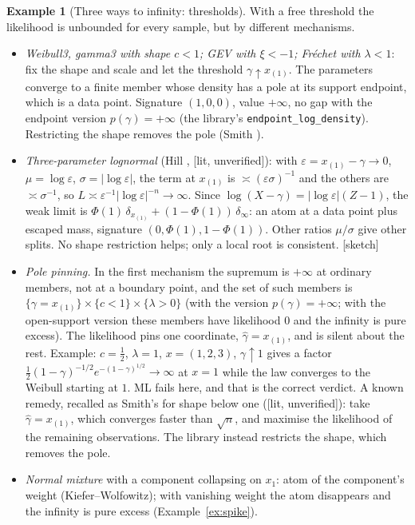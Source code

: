 \documentclass[11pt]{article}
\newcommand{\status}[1]{\textsf{[#1]}}
\theoremstyle{definition}
\newtheorem{example}[theorem]{Example}
\theoremstyle{remark}
\begin{document}
\begin{example}[Three ways to infinity: thresholds]\label{ex:thresholds}
With a free threshold the likelihood is unbounded for every sample, but by
different mechanisms.
\begin{itemize}
\item \emph{Weibull3, gamma3 with shape $c<1$; GEV with $\xi<-1$; Fr\'echet
  with $\lambda<1$}: fix the shape and scale and let the threshold
  $\gamma\uparrow x_{(1)}$. The parameters converge to a finite member whose
  density has a pole at its support endpoint, which is a data point.
  Signature $(1,0,0)$, value $+\infty$, no gap with the endpoint version
  $p(\gamma)=+\infty$ (the library's \texttt{endpoint\_log\_density}).
  Restricting the shape removes the pole (Smith \cite{smith}).
\item \emph{Three-parameter lognormal} (Hill \cite{hill},
  \status{lit, unverified}): with $\varepsilon=x_{(1)}-\gamma\to0$,
  $\mu=\log\varepsilon$, $\sigma=|\log\varepsilon|$, the term at $x_{(1)}$ is
  $\asymp(\varepsilon\sigma)^{-1}$ and the others are $\asymp\sigma^{-1}$, so
  $L\asymp\varepsilon^{-1}|\log\varepsilon|^{-n}\to\infty$. Since
  $\log(X-\gamma)=|\log\varepsilon|(Z-1)$, the weak limit is
  $\Phi(1)\,\delta_{x_{(1)}}+(1-\Phi(1))\,\delta_\infty$: an atom at a data
  point plus escaped mass, signature $(0,\Phi(1),1-\Phi(1))$. Other ratios
  $\mu/\sigma$ give other splits. No shape restriction helps; only a local
  root is consistent. \status{sketch}
\item[] \emph{Pole pinning.} In the first mechanism the supremum is $+\infty$
  at ordinary members, not at a boundary point, and the set of such members
  is $\{\gamma=x_{(1)}\}\times\{c<1\}\times\{\lambda>0\}$ (with the version
  $p(\gamma)=+\infty$; with the open-support version these members have
  likelihood $0$ and the infinity is pure excess). The likelihood pins one
  coordinate, $\hat\gamma=x_{(1)}$, and is silent about the rest. Example:
  $c=\frac12$, $\lambda=1$, $x=(1,2,3)$, $\gamma\uparrow1$ gives a factor
  $\frac12(1-\gamma)^{-1/2}e^{-(1-\gamma)^{1/2}}\to\infty$ at $x=1$ while the
  law converges to the Weibull starting at $1$. ML fails here, and that is
  the correct verdict. A known remedy, recalled as Smith's
  \cite{smith} for shape below one (\status{lit, unverified}): take
  $\hat\gamma=x_{(1)}$, which converges faster than $\sqrt n$, and maximise
  the likelihood of the remaining observations. The library instead
  restricts the shape, which removes the pole.
\item \emph{Normal mixture} with a component collapsing on $x_1$: atom of the
  component's weight (Kiefer--Wolfowitz); with vanishing weight the atom
  disappears and the infinity is pure excess (Example~\ref{ex:spike}).
\end{itemize}
\end{example}
\end{document}
